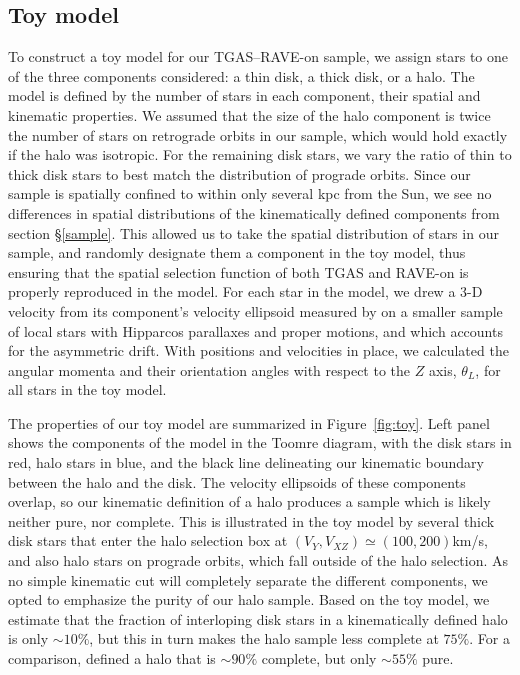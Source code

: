 \documentclass[apj, twocolappendix, numberedappendix, appendixfloats]{emulateapj}
\begin{document}
\subsection{Toy model}
\label{sec:toymodel}
To construct a toy model for our TGAS--RAVE-on sample, we assign stars to one of the three components considered: a thin disk, a thick disk, or a halo.
The model is defined by the number of stars in each component, their spatial and kinematic properties.
We assumed that the size of the halo component is twice the number of stars on retrograde orbits in our sample, which would hold exactly if the halo was isotropic.
For the remaining disk stars, we vary the ratio of thin to thick disk stars to best match the distribution of prograde orbits.
Since our sample is spatially confined to within only several kpc from the Sun, we see no differences in spatial distributions of the kinematically defined components from section \S\ref{sample}.
This allowed us to take the spatial distribution of stars in our sample, and randomly designate them a component in the toy model, thus ensuring that the spatial selection function of both TGAS and RAVE-on is properly reproduced in the model.
For each star in the model, we drew a 3-D velocity from its component's velocity ellipsoid measured by \citet{bensby2003} on a smaller sample of local stars with Hipparcos parallaxes and proper motions, and which accounts for the asymmetric drift.
With positions and velocities in place, we calculated the angular momenta and their orientation angles with respect to the $Z$ axis, $\theta_L$, for all stars in the toy model.

The properties of our toy model are summarized in Figure~\ref{fig:toy}.
Left panel shows the components of the model in the Toomre diagram, with the disk stars in red, halo stars in blue, and the black line delineating our kinematic boundary between the halo and the disk.
The velocity ellipsoids of these components overlap, so our kinematic definition of a halo produces a sample which is likely neither pure, nor complete.
This is illustrated in the toy model by several thick disk stars that enter the halo selection box at $(V_Y, V_{XZ}) \simeq (100,200)$\;km/s, and also halo stars on prograde orbits, which fall outside of the halo selection.
As no simple kinematic cut will completely separate the different components, we opted to emphasize the purity of our halo sample.
Based on the toy model, we estimate that the fraction of interloping disk stars in a kinematically defined halo is only $\sim10\%$, but this in turn makes the halo sample less complete at $75\%$.
For a comparison, \citet{ns2010} defined a halo that is $\sim90\%$ complete, but only $\sim55\%$ pure.
\end{document}
